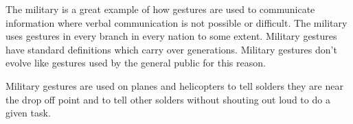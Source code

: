 The military is a great example of how gestures are used to communicate information where verbal communication is not possible or difficult. The military uses gestures in every branch in every nation to some extent. Military gestures have standard definitions which carry over generations. Military gestures don't evolve like gestures used by the general public for this reason.

Military gestures are used on planes and helicopters to tell solders they are near the drop off point and to tell other solders without shouting out loud to do a given task.